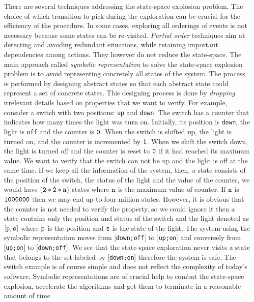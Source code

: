 There are several techniques addressing the state-space explosion problem.
The choice of which transition to pick during the exploration can be
crucial for the efficiency of the procedure. In some cases, exploring all orderings of events is not necessary because some states can be re-visited. \emph{Partial order} techniques aim at detecting and avoiding
redundant situations, while retaining important dependencies among
actions. They however do not reduce the state-space. The main approach called \emph{symbolic
  representation}  to solve the state-space explosion problem is to avoid representing concretely all states of the system. The process is performed by designing abstract states so that each abstract state could represent a set of concrete states.  This designing process is done by \emph{dropping} irrelevant details based on properties that we want to verify. For example, consider a switch with two positions: {\tt up} and {\tt down}. The switch has a counter that indicates how many times the light was turn on. Initially, its position is {\tt down}, the light is {\tt off} and the counter is $\tt 0$. When the switch is shifted up, the light is turned on, and the counter is incremented by $\tt 1$. When we shift the switch down, the light is turned off and the counter is reset to $\tt 0$ if it had reached its maximum value. We want to verify that the switch can not be up and the light is off at the same time. If we keep all the information of the system, then, a state consists of the position of the switch, the status of the light and the value of the counter, we would have $\tt (2*2*n)$ states where $\tt n$ is the maximum value of counter. If $\tt n$ is $\tt 1000000$ then we may end up to four million states.  However, it is obvious that the counter is not needed to verify the property, so we could ignore it then a state contains only the position and status of the switch and the light denoted as $\tt [p,s]$ where $\tt p$ is the position and $\tt s$ is the state of the light. The system using the symbolic representation moves from  [{\tt down;off}]  to  [{\tt up;on}]  and conversely from  [{\tt up;on}]  to  [{\tt down;off}]. We see that the state-space exploration never visits a state that belongs to the set labeled by  [{\tt down;on}]  therefore the system is safe. The switch example is of course simple and does not reflect the complexity of today’s software. Symbolic representations are of crucial help to combat the state-space explosion, accelerate the algorithms and get them to terminate in a reasonable amount of time

